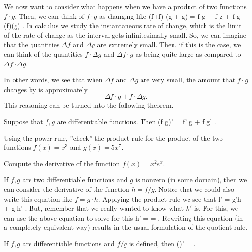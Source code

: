 \documentclass[11pt]{amsart}
\begin{document}
We now want to consider what happens when we have a product of two functions $f \cdot g$. 
Then, we can think of $f \cdot g$ as changing like
\beqn
(f+\Delta f) \cdot (g + \Delta g) = f \cdot g + \Delta f \cdot g + f \cdot \Delta g + (\Delta f)\cdot (\Delta g) .
\eeqn
In calculus we study the instantaneous rate of change, which is the limit of the rate of change as the interval gets infinitesimally small.
So, we can imagine that the quantities $\Delta f$ and $\Delta g$ are extremely small. 
Then, if this is the case, we can think of the quantities $f \cdot \Delta g$ and $\Delta f \cdot g$ as being quite large as compared to $\Delta f \cdot \Delta g$.

In other words, we see that when $\Delta f$ and $\Delta g$ are very small, the amount that $f \cdot g$ changes by is approximately 
\[
\Delta f \cdot g + f \cdot \Delta g .
\]
This reasoning can be turned into the following theorem. 

\begin{thm}
Suppose that $f,g$ are differentiable functions. 
Then
\beqn
(f \cdot g)' = f' \cdot g + f \cdot g' .
\eeqn
\end{thm}

\begin{eg}
Using the power rule, ''check'' the product rule for the product of the two functions $f(x) = x^3$ and $g(x) = 5x^7$. 
\end{eg} 

\vspace{5cm}

\begin{eg} Compute the derivative of the function $f(x) = x^2 e^x$.
\end{eg}

\newpage

If $f,g$ are two differentiable functions and $g$ is nonzero (in some domain), then we can consider the derivative of the function $h = f/g$. 
Notice that we could also write this equation like $f = g \cdot h$. 
Applying the product rule we see that
\beqn
f' = g'\cdot h + g \cdot h' .
\eeqn
But, remember that we really wanted to know what $h'$ is.
For this, we can use the above equation to solve for this
\beqn
h' =  =  .
\eeqn
Rewriting this equation (in a completely equivalent way) results in the usual formulation of the quotient rule.

\begin{thm}
If $f,g$ are differentiable functions and $f/g$ is defined, then
\beqn
\left(\right)' =  .
\eeqn
\end{thm}
\end{document}
